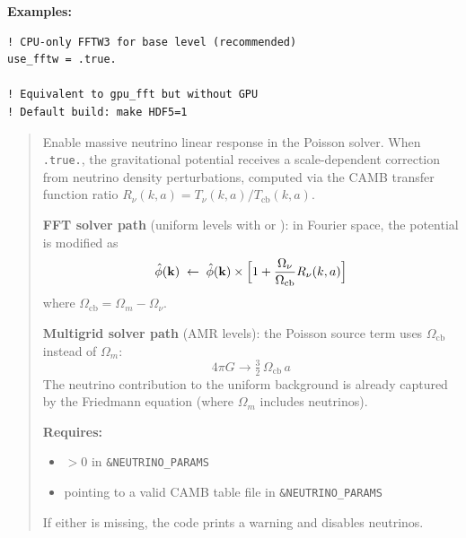 \noindent\textcolor{apidefault}{\textsf{\textbf{Examples:}}}
\begin{lstlisting}
! CPU-only FFTW3 for base level (recommended)
use_fftw = .true.

! Equivalent to gpu_fft but without GPU
! Default build: make HDF5=1
\end{lstlisting}

\label{param:use_neutrino}

\begin{quote}
Enable massive neutrino linear response in the Poisson solver.  When
\texttt{.true.}, the gravitational potential receives a scale-dependent
correction from neutrino density perturbations, computed via the CAMB
transfer function ratio $R_\nu(k,a) = T_\nu(k,a) / T_{\mathrm{cb}}(k,a)$.

\textbf{FFT solver path} (uniform levels with  or
): in Fourier space, the potential is modified as
\[
  \hat\phi(\mathbf{k}) \;\leftarrow\; \hat\phi(\mathbf{k}) \times
  \Bigl[1 + \frac{\Omega_\nu}{\Omega_{\mathrm{cb}}} R_\nu(k, a)\Bigr]
\]
where $\Omega_{\mathrm{cb}} = \Omega_m - \Omega_\nu$.

\textbf{Multigrid solver path} (AMR levels): the Poisson source term
uses $\Omega_{\mathrm{cb}}$ instead of $\Omega_m$:
\[
  4\pi G \to \tfrac{3}{2}\,\Omega_{\mathrm{cb}}\,a
\]
The neutrino contribution to the uniform background is already captured
by the Friedmann equation (where $\Omega_m$ includes neutrinos).

\textbf{Requires:}
\begin{itemize}[nosep]
  \item {} $> 0$ in \texttt{\&NEUTRINO\_PARAMS}
  \item {} pointing to a valid CAMB table file
        in \texttt{\&NEUTRINO\_PARAMS}
\end{itemize}

If either is missing, the code prints a warning and disables neutrinos.

\end{quote}


